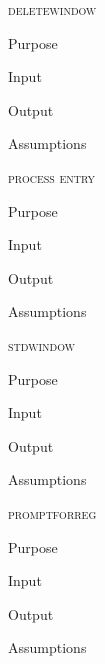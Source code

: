 \documentclass[pdftex, 11pt]{article}
\begin{document}
\begin{description}
\begin{description}
		\end{description}


	\item{\textsc{deletewindow}}

		\begin{description}
			\item{Purpose}


			\item{Input}


			\item{Output}


			\item{Assumptions}


		\end{description}


	\item{\textsc{process entry}}
		\begin{description}
			\item{Purpose}


			\item{Input}


			\item{Output}


			\item{Assumptions}


		\end{description}



	\item{\textsc{stdwindow}}
		\begin{description}
			\item{Purpose}


			\item{Input}


			\item{Output}


			\item{Assumptions}


		\end{description}



	\item{\textsc{promptforreg}}
		\begin{description}
			\item{Purpose}


			\item{Input}


			\item{Output}


			\item{Assumptions}



\end{description}
\end{description}
\end{document}
